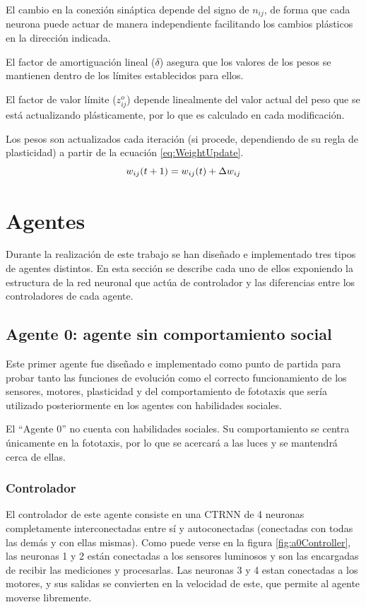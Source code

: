El cambio en la conexión sináptica depende del signo de $n_{ij}$, de forma que cada neurona puede actuar de manera independiente facilitando los cambios plásticos en la dirección indicada.

El factor de amortiguación lineal ($\delta$) asegura que los valores de los pesos se mantienen dentro de los límites establecidos para ellos.

El factor de valor límite ($z_{ij}^{o}$) depende linealmente del valor actual del peso que se está actualizando plásticamente, por lo que es calculado en cada modificación.

Los pesos son actualizados cada iteración (si procede, dependiendo de su regla de plasticidad) a partir de la ecuación \ref{eq:WeightUpdate}.
\begin{equation} \label{eq:WeightUpdate}
 \centering
 w_{ij}(t+1) = w_{ij}(t) + \Delta w_{ij}
\end{equation}

\section{Agentes}
Durante la realización de este trabajo se han diseñado e implementado tres tipos de agentes distintos. En esta sección se describe cada uno de ellos exponiendo la estructura de la red neuronal que actúa de controlador
y las diferencias entre los controladores de cada agente.
\subsection{Agente 0: agente sin comportamiento social}
Este primer agente fue diseñado e implementado como punto de partida para probar tanto las funciones de evolución como el correcto funcionamiento de los sensores, motores, plasticidad y del comportamiento de fototaxis
que sería utilizado posteriormente en los agentes con habilidades sociales.

El ``Agente 0'' no cuenta con habilidades sociales. Su comportamiento se centra únicamente en la fototaxis, por lo que se acercará a las luces y se mantendrá cerca de ellas.

\subsubsection{Controlador}
El controlador de este agente consiste en una CTRNN de 4 neuronas completamente interconectadas entre sí y autoconectadas (conectadas con todas las demás y con ellas mismas). Como puede verse en la figura \ref{fig:a0Controller},
las neuronas 1 y 2 están conectadas a los sensores luminosos y son las encargadas de recibir las mediciones y procesarlas. Las neuronas 3 y 4 estan conectadas a los motores, y sus salidas se convierten en la velocidad de este,
que permite al agente moverse libremente.

